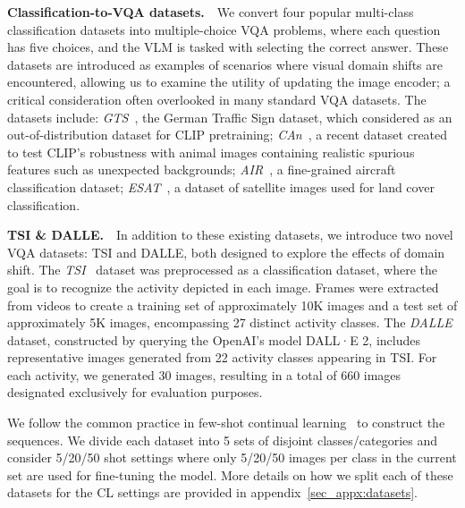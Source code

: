 \textbf{Classification-to-VQA datasets.}~~We convert four popular multi-class classification datasets into multiple-choice VQA problems, where each question has five choices, and the VLM is tasked with selecting the correct answer. These datasets are introduced as examples of scenarios where visual domain shifts are encountered, allowing us to examine the utility of updating the image encoder; a critical consideration often overlooked in many standard VQA datasets.%
The datasets include:
\emph{GTS}~\cite{stallkamp2012man}, the German Traffic Sign dataset, which \citet{zhang2024overcoming} considered as an out-of-distribution dataset for CLIP pretraining; \emph{CAn}~\cite{wang2024clips}, a recent dataset created to test CLIP's robustness with animal images containing realistic spurious features such as unexpected backgrounds; \emph{AIR}~\cite{maji13fine-grained}, a fine-grained aircraft classification dataset; \emph{ESAT}~\cite{helber2019eurosat}, a dataset of satellite images used for land cover classification.

\textbf{TSI \& DALLE.}~~In addition to these existing datasets, we introduce two novel VQA datasets: TSI and DALLE, both designed to explore the effects of domain shift.
The \emph{TSI}~\cite{das2019toyota} dataset was preprocessed as a classification dataset, where the goal is to recognize the activity depicted in each image. Frames were extracted from videos to create a training set of approximately 10K images and a test set of approximately 5K images, encompassing 27 distinct activity classes. The \emph{DALLE} dataset, constructed by querying the OpenAI's model DALL·E 2, includes representative images generated from 22 activity classes appearing in TSI. For each activity, we generated 30 images, resulting in a total of 660 images designated exclusively for evaluation purposes. %

We follow the common practice in few-shot continual learning~\cite{panos2023first} to construct the sequences. We divide each dataset into 5 sets of disjoint classes/categories and consider 5/20/50 shot settings where only 5/20/50 images per class in the current set are used for fine-tuning the model. More details on how we split each of these datasets for the CL settings are provided in appendix~\ref{sec_appx:datasets}.

